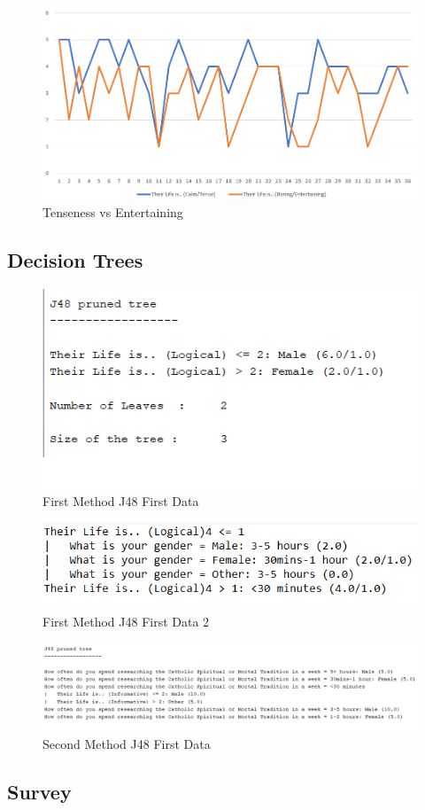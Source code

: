 \documentclass[11pt]{article}
\begin{document}
\begin{figure}[h]
\caption{Tenseness vs Entertaining}
\label{tab:TensenessvsEntertaining}
 \centering
 \includegraphics[scale=0.75]{Tenseness vs Entertaining.png}
\end{figure}

\pagebreak

\subsection{Decision Trees}

\begin{figure}[h]
\caption{First Method J48 First Data}
\label{tab:FirstMethodJ481}
 \centering
 \includegraphics[scale=0.75]{First Method J48 1.png}
\end{figure}

\begin{figure}[h]
\caption{First Method J48 First Data 2}
\label{tab:FirstMethodJ482}
 \centering
 \includegraphics[scale=0.75]{First Method J48 2.png}
\end{figure}

\begin{figure}[h]
\caption{Second Method J48 First Data}
\label{tab:SecondMethodJ481}
 \centering
 \includegraphics[scale=0.75]{Second Method J48 1.png}
\end{figure}
\pagebreak
\subsection{Survey}


\end{document}

